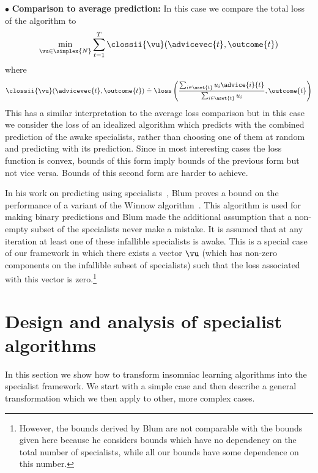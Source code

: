 $\bullet$ {\bf Comparison to average prediction:}
In this case we compare the total loss of the algorithm to
\begin{equation} \label{eqn:compii}
\min_{\vu \in \simplex{N}} \sum_{t=1}^T 
\clossii{\vu}(\advicevec{t},\outcome{t})
\end{equation}
where
\[
\clossii{\vu}(\advicevec{t},\outcome{t}) \doteq
  \loss \left(
   \frac{\sum_{i \in \aset{t}} u_i \advice{i}{t}}
        {\sum_{i \in \aset{t}} u_i}
   ,\outcome{t}
  \right)
\]
This has a similar interpretation to the average loss comparison but
in this case we consider the loss of an idealized algorithm which
predicts with the combined prediction of the awake specialists, rather
than choosing one of them at random and predicting with its prediction.
Since in most interesting cases the loss function is
convex, bounds of this form imply bounds of the previous form but not
vice versa. Bounds of this second form are harder to achieve.

\medskip

In his work on predicting using specialists~\cite{Blum95},
Blum proves a bound on the performance of a variant of the
Winnow algorithm~\cite{Littlestone88}.
This algorithm is used for making binary predictions
and Blum made the
additional assumption that a non-empty subset of the specialists never
make a mistake. It is assumed that at any iteration at least one of
these infallible specialists is awake. This is a special case of our 
framework in which there exists a vector $\vu$ 
(which has non-zero components on the infallible 
subset of specialists)
such that the loss associated with this vector is 
zero.\footnote{
However, the bounds derived by Blum are not comparable with the 
bounds given here because he considers bounds which have no dependency
on the total number of specialists, while all our bounds have some
dependence on this number.}

\section{Design and analysis of specialist algorithms}

In this section we show how to transform insomniac learning algorithms
into the specialist framework.  We start with a simple case and then
describe a general transformation which we then apply to other, more
complex cases.

